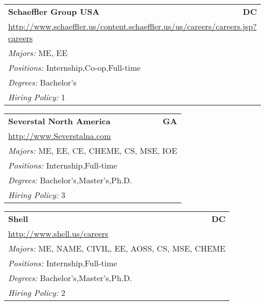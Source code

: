 \documentclass[twoside]{article}
\begin{document}
\begin{center}
\begin{multicols}{3}
\begin{FlushLeft}
\begin{minipage}{.9\columnwidth}
\end{minipage}
 
\begin{minipage}{.9\columnwidth}\begin{tabularx}{.95\columnwidth}{Xr}
                 {\Large\bf Schaeffler Group USA} & {\Large\bf DC}\\
    \multicolumn{2}{p{.95\columnwidth}}{\url{http://www.schaeffler.us/content.schaeffler.us/us/careers/careers.jsp?careers}}\\
    \multicolumn{2}{p{.95\columnwidth}}{\emph{Majors:} ME, EE}\\
    \multicolumn{2}{p{.95\columnwidth}}{\emph{Positions:} Internship,Co-op,Full-time}\\
    \multicolumn{2}{p{.95\columnwidth}}{\emph{Degrees:} Bachelor's}\\
    \multicolumn{2}{p{.95\columnwidth}}{\emph{Hiring Policy:} 1}\\
    \end{tabularx}
    
\end{minipage}
 
\begin{minipage}{.9\columnwidth}\begin{tabularx}{.95\columnwidth}{Xr}
                 {\Large\bf Severstal North America} & {\Large\bf GA}\\
    \multicolumn{2}{p{.95\columnwidth}}{\url{http://www.Severstalna.com}}\\
    \multicolumn{2}{p{.95\columnwidth}}{\emph{Majors:} ME, EE, CE, CHEME, CS, MSE, IOE}\\
    \multicolumn{2}{p{.95\columnwidth}}{\emph{Positions:} Internship,Full-time}\\
    \multicolumn{2}{p{.95\columnwidth}}{\emph{Degrees:} Bachelor's,Master's,Ph.D.}\\
    \multicolumn{2}{p{.95\columnwidth}}{\emph{Hiring Policy:} 3}\\
    \end{tabularx}
    
\end{minipage}
 
\begin{minipage}{.9\columnwidth}\begin{tabularx}{.95\columnwidth}{Xr}
                 {\Large\bf Shell} & {\Large\bf DC}\\
    \multicolumn{2}{p{.95\columnwidth}}{\url{http://www.shell.us/careers}}\\
    \multicolumn{2}{p{.95\columnwidth}}{\emph{Majors:} ME, NAME, CIVIL, EE, AOSS, CS, MSE, CHEME}\\
    \multicolumn{2}{p{.95\columnwidth}}{\emph{Positions:} Internship,Full-time}\\
    \multicolumn{2}{p{.95\columnwidth}}{\emph{Degrees:} Bachelor's,Master's,Ph.D.}\\
    \multicolumn{2}{p{.95\columnwidth}}{\emph{Hiring Policy:} 2}\\
    \end{tabularx}
    

\end{minipage}
\end{FlushLeft}
\end{multicols}
\end{center}
\end{document}
